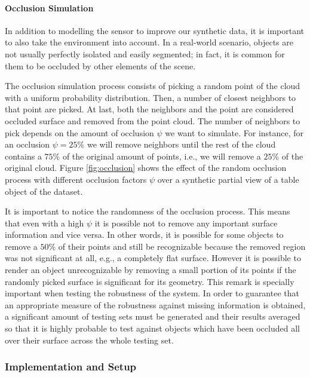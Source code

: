 \paragraph{Occlusion Simulation}

In addition to modelling the sensor to improve our synthetic data, it is important to also take the environment into account. In a real-world scenario, objects are not usually perfectly isolated and easily segmented; in fact, it is common for them to be occluded by other elements of the scene.

The occlusion simulation process consists of picking a random point of the cloud with a uniform probability distribution. Then, a number of closest neighbors to that point are picked. At last, both the neighbors and the point are considered occluded surface and removed from the point cloud. The number of neighbors to pick depends on the amount of occlusion $\psi$ we want to simulate. For instance, for an occlusion $\psi=25\%$ we will remove neighbors until the rest of the cloud contains a $75\%$ of the original amount of points, i.e., we will remove a $25\%$ of the original cloud. Figure \ref{fig:occlusion} shows the effect of the random occlusion process with different occlusion factors $\psi$ over a synthetic partial view of a table object of the dataset.

It is important to notice the randomness of the occlusion process. This means that even with a high $\psi$ it is possible not to remove any important surface information and vice versa. In other words, it is possible for some objects to remove a $50\%$ of their points and still be recognizable because the removed region was not significant at all, e.g., a completely flat surface. However it is possible to render an object unrecognizable by removing a small portion of its points if the randomly picked surface is significant for its geometry. This remark is specially important when testing the robustness of the system. In order to guarantee that an appropriate measure of the robustness against missing information is obtained, a significant amount of testing sets must be generated and their results averaged so that it is highly probable to test against objects which have been occluded all over their surface across the whole testing set.

\subsubsection{Implementation and Setup}
\label{cha:objrecog:sec:study:subsec:experiments:subsubsec:setup}

